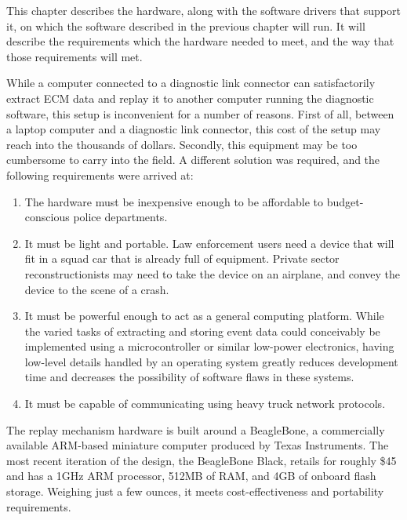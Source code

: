 
This chapter describes the hardware, along with the software drivers that support it, on which
the software described in the previous chapter will run. It will describe the requirements which
the hardware needed to meet, and the way that those requirements will met.



While a computer connected to a diagnostic link connector can satisfactorily extract ECM data and replay
it to another computer running the diagnostic software, this setup is inconvenient for a number of reasons.
First of all, between a laptop computer and a diagnostic link connector, this cost of the setup
may reach into the thousands of dollars. Secondly, this equipment may be too cumbersome to carry into the field.
A different solution was required, and the following requirements were arrived at:

\begin{enumerate}
  \item The hardware must be inexpensive enough to be affordable to budget-conscious police departments.
  \item It must be light and portable. Law enforcement users need a device that will fit in a squad car that is already full of equipment.
        Private sector reconstructionists may need to take the device on an airplane, and convey the device to the scene of a crash.
  \item It must be powerful enough to act as a general computing platform. While the varied tasks of extracting and storing event data 
        could conceivably be implemented using a microcontroller or similar low-power electronics, having low-level details handled by
        an operating system greatly reduces development time and decreases the possibility of software flaws in these systems.
  \item It must be capable of communicating using heavy truck network protocols.
\end{enumerate}



The replay mechanism hardware is built around a BeagleBone, a commercially available ARM-based miniature computer produced
by Texas Instruments\cite{BeagleBone}. The most recent iteration of the design, the BeagleBone Black, retails for roughly \$45 and has a 1GHz ARM
processor, 512MB of RAM, and 4GB of onboard flash storage. Weighing just a few ounces, it meets cost-effectiveness and portability
requirements.

